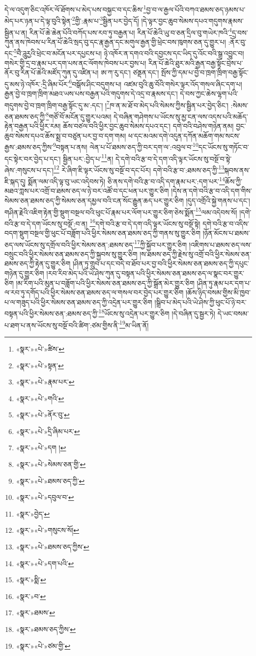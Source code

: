 དེ་ལ་འདུག་ཅིང་འཁོར་ལོ་ཐོགས་པ་མེད་པས་བསྐྱང་བ་དང་ཆིས་\footnote{«སྣར་»«པེ་»ཚིས་}བྱ་བ་ལ་རྒྱལ་པོའི་བཀའ་ཐམས་ཅད་ཉམས་པ་མེད་པར་ཉན་པ་དེ་ལྟ་བུའི་སྟེན་\footnote{«སྣར་»«པེ་»སྟན་}གྱི་:རྣམ་པ་\footnote{«སྣར་»«པེ་»རྣམ་པར་}སྦྱིན་པར་བྱེད་དོ། །དེ་ལྟར་བྱང་ཆུབ་སེམས་དཔའ་གདུགས་རྣམས་སྦྱིན་པ་ན། རིན་པོ་ཆེ་ཆེན་པོའི་བཀོད་པས་རབ་ཏུ་བརྒྱན་པ། རིན་པོ་ཆེའི་ཡུ་བ་ཅན་དྲིལ་བུ་གཡེར་ཁའི་\footnote{«སྣར་»«པེ་»གའི་}དྲ་བས་ཀུན་ནས་ཁེབས་པ་རིན་པོ་ཆེའི་སྲད་བུ་དང་རྣ་རྒྱན་དང་མགུལ་རྒྱན་གྱི་ཕྲེང་བས་ཁུགས་ཅན་དུ་གྱུར་པ། :ནོར་བུ་དང་\footnote{«སྣར་»«པེ་»ནོར་བུ་}བཻ་ཌཱུརྱའི་ཕྲེང་བ་མངོན་པར་དཔྱངས་པ། ཉེ་འཁོར་ན་དགའ་བའི་དབྱངས་དང་ཡིད་དུ་འོང་བའི་སྒྲ་འབྱུང་བ། གསེར་གྱི་དྲ་བ་རྣམ་པར་དག་པས་ནང་ལོགས་ཁེབས་པར་བྱས་པ། རིན་པོ་ཆེའི་ཐུར་མའི་རྒྱན་བརྒྱ་སྟོང་བྲེས་པ་ནོར་བུ་རིན་པོ་ཆེའི་མཛོད་ཀུན་དུ་འཛིན་པ། ཨ་ཀ་རུ་དང་། ཙནྡན་དང་། སྤོས་ཀྱི་དམ་པ་བྱེ་བ་ཁྲག་ཁྲིག་བརྒྱ་སྟོང་དུ་མས་ཉེ་འཁོར་:དྲི་ཞིམ་པོར་\footnote{«སྣར་»«པེ་»དྲི་ཞིམ་པར་}བསྒོས་ཤིང་བདུགས་པ། འཛམ་བུའི་ཆུ་བོའི་གསེར་ལྟར་འོད་གསལ་ཞིང་དག་པ། རྒྱན་བྱེ་བ་ཁྲག་ཁྲིག་མཐའ་ཡས་པས་བརྒྱན་པའི་གདུགས་དེ་འདྲ་བ་རྣམས་དང་། དེ་བས་ཀྱང་ཆེས་ལྷག་པའི་གདུགས་བྱེ་བ་ཁྲག་ཁྲིག་བརྒྱ་སྟོང་དུ་མ་:དང་། །\footnote{«སྣར་»«པེ་»དག །}ཁ་ན་མ་ཐོ་བ་མེད་པའི་སེམས་ཀྱིས་སྦྱིན་པར་བྱེད་ཅིང་། :སེམས་ཅན་ཐམས་ཅད་ཀྱི་\footnote{«སྣར་»«པེ་»སེམས་ཅན་གྱི་}གཙོ་བོ་མངོན་དུ་གྱུར་པའམ། དེ་བཞིན་གཤེགས་པ་ཡོངས་སུ་མྱ་ངན་ལས་འདས་པའི་མཆོད་རྟེན་བརྒྱན་པའི་ཕྱིར་རམ། ཆོས་བཙལ་བའི་ཕྱིར་བྱང་ཆུབ་སེམས་དཔའ་དང་། དགེ་བའི་བཤེས་གཉེན་ནམ། བྱང་ཆུབ་སེམས་དཔའ་ཆོས་སྨྲ་བ་བཙུན་པར་བྱ་བ་དག་གམ། ཕ་དང་མའམ་དགེ་འདུན་དཀོན་མཆོག་གམ་སངས་རྒྱས་:ཐམས་ཅད་ཀྱིས་\footnote{«སྣར་»«པེ་»ཐམས་ཅད་ཀྱི་}བསྟན་པ་ནས། ལེན་པ་པོ་ཐམས་ཅད་ཀྱི་བར་དག་ལ་:འབུལ་བ་\footnote{«སྣར་»«པེ་»དབུལ་བ་}དང་ཡོངས་སུ་གཏོང་བ་དང་སྟེར་བར་བྱེད་པ་དང་། སྦྱིན་པར་:བྱེད་པ་\footnote{«སྣར་»བྱེད་}ན། དེ་དགེ་བའི་རྩ་བ་དེ་དག་འདི་ལྟར་ཡོངས་སུ་བསྔོ་བ་སྟེ་ཞེས་:གསུངས་པ་དང་།\footnote{«སྣར་»«པེ་»གསུངས་སོ།} རེ་ཞིག་ཇི་ལྟར་ཡོངས་སུ་བསྔོ་བ་དང་པོར། དགེ་བའི་རྩ་བ་:ཐམས་ཅད་ཀྱི་\footnote{«སྣར་»«པེ་»ཐམས་ཅད་ཀྱིས་}སྐབས་ནས་ཇི་སྐད་དུ། སྨོན་ལམ་འདི་ལྟ་བུ་ཡང་འདེབས་ཏེ། ཅི་ནས་དགེ་བའི་རྩ་བ་འདི་དག་རྣམ་པར་:དག་པར་\footnote{«སྣར་»«པེ་»དག་པའི་}ཆོས་ཀྱི་མཐའ་ཀླས་པར་འགྲོ་བ་ཐམས་ཅད་ལ་ཉེ་བར་འཚོ་བ་དང་ཕན་པར་གྱུར་ཅིག །དེས་ན་དགེ་བའི་རྩ་བ་འདི་དག་གིས་སེམས་ཅན་ཐམས་ཅད་ཀྱི་སེམས་ཅན་དམྱལ་བའི་ངན་སོང་རྒྱུན་ཆད་པར་གྱུར་ཅིག །དུད་འགྲོའི་སྐྱེ་གནས་པ་དང་། གཤིན་རྗེའི་འཇིག་རྟེན་གྱི་སྡུག་བསྔལ་བའི་ཕུང་པོ་རྣམ་པར་ལོག་པར་གྱུར་ཅིག་ཅེས་སྨོན་\footnote{«སྣར་»སྨི་}ལམ་འདེབས་སོ། །དགེ་བའི་རྩ་བ་དེ་དག་ཡོངས་སུ་བསྔོ་:བ་ན། \footnote{«སྣར་»བ་}དགེ་བའི་རྩ་བ་དེ་དག་འདི་ལྟར་ཡོངས་སུ་བསྔོ་སྟེ། དགེ་བའི་རྩ་བ་འདིས་བདག་སྡུག་བསྔལ་གྱི་ཕུང་པོ་བཟློག་པའི་ཕྱིར་སེམས་ཅན་ཐམས་ཅད་ཀྱི་གནས་སུ་གྱུར་ཅིག །ཉོན་མོངས་པ་ཐམས་ཅད་ལས་ཡོངས་སུ་དགྲོལ་བའི་ཕྱིར་སེམས་ཅན་:ཐམས་ཅད་\footnote{«སྣར་»ཐམས་}ཀྱི་སྐྱོབ་པར་གྱུར་ཅིག །འཇིགས་པ་ཐམས་ཅད་ལས་བསྲུང་བའི་ཕྱིར་སེམས་ཅན་ཐམས་ཅད་ཀྱི་སྐྱབས་སུ་གྱུར་ཅིག །ས་ཐམས་ཅད་ཀྱི་རྗེས་སུ་འགྲོ་བའི་ཕྱིར་སེམས་ཅན་ཐམས་ཅད་ཀྱི་རྟེན་དུ་གྱུར་ཅིག །ཤིན་ཏུ་གྲུབ་པ་དང་བདེ་བ་ཐོབ་པར་བྱ་བའི་ཕྱིར་སེམས་ཅན་ཐམས་ཅད་ཀྱི་དཔུང་གཉེན་དུ་གྱུར་ཅིག །རབ་རིབ་མེད་པའི་ཡེ་ཤེས་ཀུན་དུ་བསྟན་པའི་ཕྱིར་སེམས་ཅན་ཐམས་ཅད་ལ་སྣང་བར་གྱུར་ཅིག །མ་རིག་པའི་མུན་པ་བཟློག་པའི་ཕྱིར་སེམས་ཅན་ཐམས་ཅད་ཀྱི་སྒྲོན་མེར་གྱུར་ཅིག །ཤིན་ཏུ་རྣམ་པར་དག་པ་ལ་རབ་ཏུ་དགོད་པའི་ཕྱིར་སེམས་ཅན་ཐམས་ཅད་ལ་གསལ་བར་བྱེད་པར་གྱུར་ཅིག །ཆོས་ཉིད་བསམ་གྱིས་མི་ཁྱབ་པ་ལ་གཟུད་པའི་ཕྱིར་སེམས་ཅན་ཐམས་ཅད་ཀྱི་འདྲེན་པར་གྱུར་ཅིག །སྒྲིབ་པ་མེད་པའི་ཡེ་ཤེས་ཀྱི་ཕུང་པོ་ཉེ་བར་བསྟན་པའི་ཕྱིར་སེམས་ཅན་:ཐམས་ཅད་ཀྱི་\footnote{«སྣར་»ཐམས་ཅད་ཀྱིས་}ཡོངས་སུ་འདྲེན་པར་གྱུར་ཅིག །དེ་བཞིན་དུ་སྦྱར་ཏེ། དེ་ཡང་བསམ་པ་ཐག་པ་ནས་ཡོངས་སུ་བསྔོ་བའི་ཚིག་:ཙམ་གྱིས་ནི་\footnote{«སྣར་»«པེ་»ཙམ་གྱི་}མ་ཡིན་ནོ། 